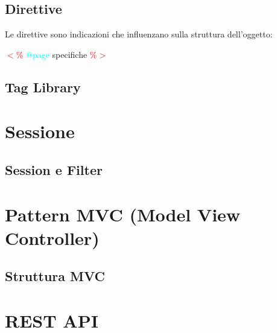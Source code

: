 \documentclass[11pt, letterpaper, titlepage]{article}
\newcommand{\openab}{\textcolor{red}{$<$\%} }
\newcommand{\closeab}{\textcolor{red}{\%$>$} }
\begin{document}
\subsection{Direttive}
Le direttive sono indicazioni che influenzano sulla struttura dell'oggetto:\par
\openab\textcolor{cyan}{@page} specifiche \closeab

\subsection{Tag Library}

\section{Sessione}

\subsection{Session e Filter}

\section{Pattern MVC (Model View Controller)}

\newpage
\subsection{Struttura MVC}

\newpage

\section{REST API}
\end{document}
